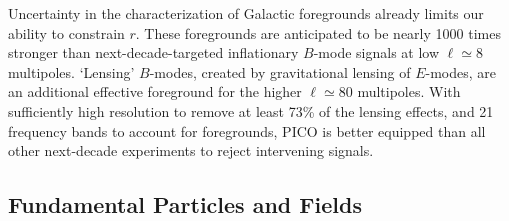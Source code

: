 \documentclass[PICOAPC.tex]{subfiles}
\begin{document}
Uncertainty in the characterization of Galactic foregrounds already limits our ability to constrain $r$. These foregrounds 
are anticipated to be nearly 1000 times stronger than next-decade-targeted inflationary $B$-mode signals at low $\ell \simeq 8$ multipoles. `Lensing' $B$-modes, created by gravitational lensing of $E$-modes, are an additional effective foreground for the higher $\ell \simeq 80$ multipoles. With sufficiently high resolution to remove at least 73\% of the lensing effects, and 21 frequency bands to account for foregrounds, PICO is better equipped than all other next-decade experiments to reject intervening signals. 

\vspace{-0.06in}

\subsection{Fundamental Particles and Fields} %
\label{sec:relics_neutrinos}

\end{document}
